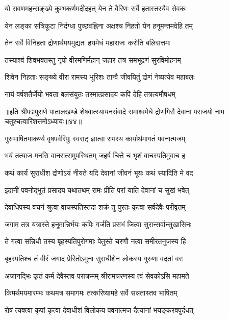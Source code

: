\twolineshloka
{यो रावणमहन्सङ्ख्ये कुम्भकर्णमदीदहत्}
{येन ते वैरिणः सर्वे हतास्तस्यैव सेवकः}%

\twolineshloka
{येन लङ्का सत्रिकूटा निर्दग्धा पुच्छवह्निना}
{अक्षश्च निहतो येन हनूमन्तमवेहि तम्}%

\twolineshloka
{तेन सर्वे विनिहता द्रोणार्थमयमुद्यतः}
{हयमेधं महाराजः करोति बलिसत्तमः}%

\twolineshloka
{तस्याश्वं शिवभक्तस्तु नृपो वीरमणिर्महान्}
{जहार तत्र समभूद्रणं सुरविमोहनम्}%

\twolineshloka
{शिवेन निहताः सङ्ख्ये वीरा रामस्य भूरिशः}
{तान्वै जीवयितुं द्रोणं नेष्यत्येव महाबलः}%

\twolineshloka
{नायं वर्षशतैर्जेयो भवता बलसंयुतः}
{तस्मात्प्रसादय कपिं देहि तत्रत्यमौषधम्}%

{॥इति श्रीपद्मपुराणे पातालखण्डे शेषवात्स्यायनसंवादे रामाश्वमेधे द्रोणगिरौ देवानां पराजयो नाम चतुश्चत्वारिंशत्तमोऽध्यायः॥४४॥}



\twolineshloka
{गुरुभाषितमाकर्ण्य वृषपर्वरिपुः स्वराट्}
{ज्ञात्वा रामस्य कार्यार्थमागतं पवनात्मजम्}%

\twolineshloka
{भयं तत्याज मनसि वानरात्समुपस्थितम्}
{जहर्ष चित्ते च भृशं वाचस्पतिमुवाच ह}%


\twolineshloka
{कथं कार्यं सुराधीश द्रोणोऽयं नीयते यदि}
{देवानां जीवनं भूयः कथं स्यादिति मे वद}%

\twolineshloka
{इदानीं पवनोद्भूतं प्रसादय यथातथम्}
{रामः प्रीतिं परां याति देवानां च सुखं भवेत्}%

\twolineshloka
{देवाधिपस्य वचनं श्रुत्वा वाचस्पतिस्तदा}
{शक्रं तु पुरतः कृत्वा सर्वदेवैः परीवृतम्}%

\twolineshloka
{जगाम तत्र यत्रास्ते हनूमान्निर्भयः कपिः}
{गर्जति प्रसभं जित्वा सुरान्सर्वान्सुखासिनः}%

\twolineshloka
{ते गत्वा सन्निधौ तस्य बृहस्पतिपुरोगमाः}
{पेतुस्ते चरणौ नत्वा समीरतनुजस्य हि}%

\twolineshloka
{बृहस्पतिश्च तं वीरं जगाद प्रेरितोऽमुना}
{सुराधीशेन लोकस्य गुरुणा वदतां वरः}%

\twolineshloka
{अजानद्भिः कृतं कर्म देवैस्तव पराक्रमम्}
{श्रीरामचरणस्य त्वं सेवकोऽसि महामते}%

\twolineshloka
{किमर्थमयमारम्भः कथमत्र समागमः}
{तत्करिष्यामहे सर्वे सन्नतास्तव भाषितम्}%

\twolineshloka
{रोषं त्यक्त्वा कृपां कृत्वा देवाधीशं विलोकय}
{पवनात्मज दैत्यानां भयङ्करवपुर्दधत्}%

